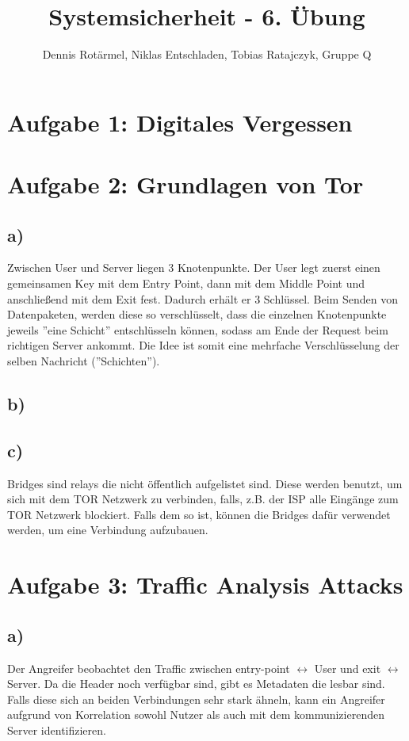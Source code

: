 \documentclass[]{article}
\title{Systemsicherheit - 6. Übung}
\author{Dennis Rotärmel, Niklas Entschladen, Tobias Ratajczyk, Gruppe Q}
\begin{document}
\maketitle
\section{Aufgabe 1: Digitales Vergessen}
\section{Aufgabe 2: Grundlagen von Tor}
\subsection*{a)}
Zwischen User und Server liegen 3 Knotenpunkte. Der User legt zuerst einen gemeinsamen Key mit dem Entry Point, dann mit dem Middle Point und anschließend mit dem Exit fest. Dadurch erhält er 3 Schlüssel. Beim Senden von Datenpaketen, werden diese so verschlüsselt, dass die einzelnen Knotenpunkte jeweils ''eine Schicht'' entschlüsseln können, sodass am Ende der Request beim richtigen Server ankommt. Die Idee ist somit eine mehrfache Verschlüsselung der selben Nachricht (''Schichten''). 
\subsection*{b)}
\subsection*{c)}
Bridges sind relays die nicht öffentlich aufgelistet sind. Diese werden benutzt, um sich mit dem TOR Netzwerk zu verbinden, falls, z.B. der ISP alle Eingänge zum TOR Netzwerk blockiert. Falls dem so ist, können die Bridges dafür verwendet werden, um eine Verbindung aufzubauen.
\section{Aufgabe 3: Traffic Analysis Attacks}
\subsection*{a)}
Der Angreifer beobachtet den Traffic zwischen entry-point $\leftrightarrow$ User und exit $\leftrightarrow$ Server. Da die Header noch verfügbar sind, gibt es Metadaten die lesbar sind. Falls diese sich an beiden Verbindungen sehr stark ähneln, kann ein Angreifer aufgrund von Korrelation sowohl Nutzer als auch mit dem kommunizierenden Server identifizieren.
\end{document}
